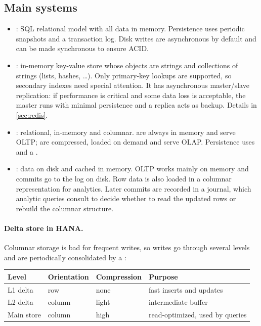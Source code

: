 \subsection{Main systems}
\begin{itemize}
  \item {}: SQL relational model with all data in memory. Persistence uses periodic snapshots and a transaction log. Disk writes are asynchronous by default and can be made synchronous to ensure ACID.
  \item {}: in-memory key-value store whose objects are strings and collections of strings (lists, hashes, \dots). Only primary-key lookups are supported, so secondary indexes need special attention. It has asynchronous master/slave replication: if performance is critical and some data loss is acceptable, the master runs with minimal persistence and a replica acts as backup. Details in \cref{sec:redis}.
  \item {}: relational, in-memory and columnar.  are always in memory and serve OLTP;  are compressed, loaded on demand and serve OLAP. Persistence uses  and a .
  \item {}: data on disk and cached in memory. OLTP works mainly on memory and commits go to the log on disk. Row data is also loaded in a columnar representation for analytics. Later commits are recorded in a journal, which analytic queries consult to decide whether to read the updated rows or rebuild the columnar structure.
\end{itemize}

\paragraph{Delta store in HANA.} Columnar storage is bad for frequent writes, so writes go through several levels and are periodically consolidated by a :
\begin{center}\small
\begin{tabular}{llll}
\toprule
\textbf{Level} & \textbf{Orientation} & \textbf{Compression} & \textbf{Purpose} \\
\midrule
L1 delta & row & none & fast inserts and updates \\
L2 delta & column & light & intermediate buffer \\
Main store & column & high & read-optimized, used by queries \\
\bottomrule
\end{tabular}
\end{center}
